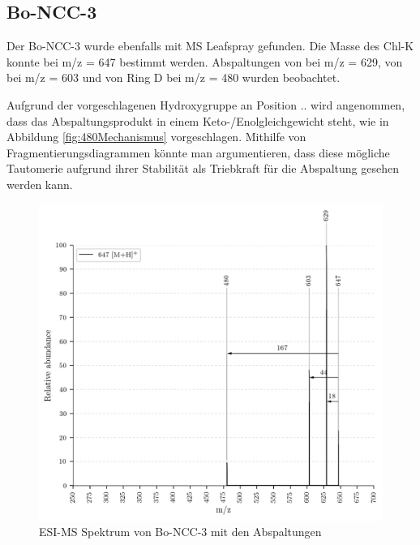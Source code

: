 \subsection{Bo-NCC-3}

Der Bo-NCC-3 wurde ebenfalls mit MS Leafspray gefunden. Die Masse des \gls{Chl-K} konnte bei m/z = 647 bestimmt werden. Abspaltungen von  bei m/z = 629, von  bei m/z = 603 und von Ring D bei m/z = 480 wurden beobachtet. 

Aufgrund der vorgeschlagenen Hydroxygruppe an Position .. wird angenommen, dass das Abspaltungsprodukt in einem Keto-/Enolgleichgewicht steht, wie in Abbildung \ref{fig:480Mechanismus} vorgeschlagen. Mithilfe von Fragmentierungsdiagrammen könnte man argumentieren, dass diese mögliche Tautomerie aufgrund ihrer Stabilität als Triebkraft für die Abspaltung gesehen werden kann.

\begin{figure}[!htbp]
  \centering
  \includegraphics[width=\textwidth, height=0.7\textwidth]{figures/Kapitel7/Kataboliten/VWA_MS_647.png}
  \caption[ESI-MS Spektrum von Bo-NCC-3, Quelle: Autor]{ESI-MS Spektrum von Bo-NCC-3 mit den Abspaltungen}
  \label{fig:647MH}
\end{figure}

